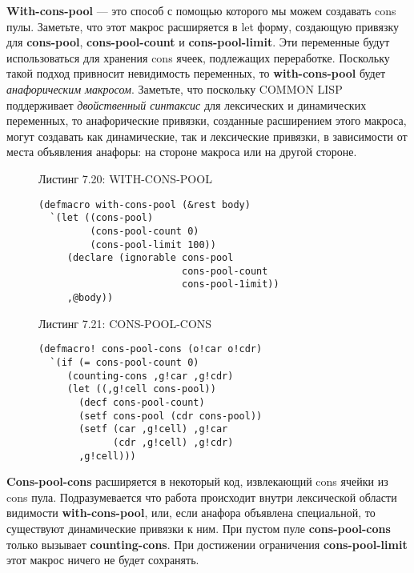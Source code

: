 \textbf{With-cons-pool} --- это способ с помощью которого мы можем создавать cons пулы. Заметьте, что этот макрос расширяется в let форму, создающую привязку для \textbf{cons-pool}, \textbf{cons-pool-count} и \textbf{cons-pool-limit}. Эти переменные будут использоваться для хранения cons ячеек, подлежащих переработке. Поскольку такой подход привносит невидимость переменных, то \textbf{with-cons-pool} будет \emph{анафорическим макросом}. Заметьте, что поскольку COMMON LISP поддерживает \emph{двойственный синтаксис} для лексических и динамических переменных, то анафорические привязки, созданные расширением этого макроса, могут создавать как динамические, так и лексические привязки, в зависимости от места объявления анафоры: на стороне макроса или на другой стороне.

\begin{figure}Листинг 7.20: WITH-CONS-POOL\label{listing_7.20}
\listbegin
\begin{verbatim}
(defmacro with-cons-pool (&rest body)
  `(let ((cons-pool)
         (cons-pool-count 0)
         (cons-pool-limit 100))
     (declare (ignorable cons-pool
                         cons-pool-count
                         cons-pool-1imit))
     ,@body))
\end{verbatim}
\listend
\end{figure}

\begin{figure}Листинг 7.21: CONS-POOL-CONS\label{listing_7.21}
\listbegin
\begin{verbatim}
(defmacro! cons-pool-cons (o!car o!cdr)
  `(if (= cons-pool-count 0)
     (counting-cons ,g!car ,g!cdr)
     (let ((,g!cell cons-pool))
       (decf cons-pool-count)
       (setf cons-pool (cdr cons-pool))
       (setf (car ,g!cell) ,g!car
             (cdr ,g!cell) ,g!cdr)
       ,g!cell)))
\end{verbatim}
\listend
\end{figure}

\textbf{Cons-pool-cons} расширяется в некоторый код, извлекающий cons ячейки из cons пула. Подразумевается что работа происходит внутри лексической области видимости \textbf{with-cons-pool}, или, если анафора объявлена специальной, то существуют динамические привязки к ним. При пустом пуле \textbf{cons-pool-cons} только вызывает \textbf{counting-cons}. При достижении ограничения \textbf{cons-pool-limit} этот макрос ничего не будет сохранять.

